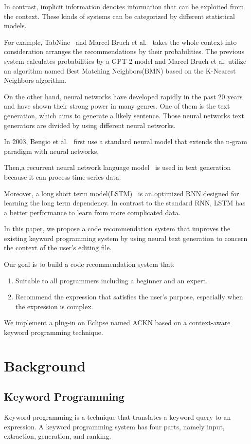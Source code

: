 \documentclass[PRO,english]{ipsj}
\begin{document}
In contrast, implicit information denotes information that can be exploited from the context. These kinds of systems can be categorized by different statistical models.

For example, TabNine~\cite{TabNine} and Marcel Bruch et al.~\cite{Marcel} takes the whole context into consideration arranges the recommendations by their probabilities. The previous system calculates probabilities by a GPT-2 model and Marcel Bruch et al. utilize an algorithm named Best Matching Neighbors(BMN) based on the K-Nearest Neighbors algorithm. 

On the other hand, neural networks have developed rapidly in the past 20 years and have shown their strong power in many genres. One of them is the text generation, which aims to generate a likely sentence. Those neural networks text generators are divided by using different neural networks.~\cite{NNTG}

In 2003, Bengio et al.~\cite{Bengio} first use a standard neural model that extends the n-gram paradigm with neural networks. 

Then,a recurrent neural network language model~\cite{RNN} is used in text generation because it can process time-series data.

Moreover, a long short term model(LSTM)~\cite{LSTM} is an optimized RNN designed for learning the long term dependency. In contrast to the standard RNN, LSTM has a better performance to learn from more complicated data.
		
In this paper, we propose a code recommendation system that improves the existing keyword programming system by using neural text generation to concern the context of the user’s editing file.

Our goal is to build a code recommendation system that:
\begin{enumerate}
\item Suitable to all programmers including a beginner and an expert.
\item Recommend the expression that satisfies the user’s purpose, especially when the expression is complex.
\end{enumerate}

We implement a plug-in on Eclipse named ACKN based on a context-aware keyword programming technique. 

\section{Background}
\subsection{Keyword Programming}
Keyword programming is a technique that translates a keyword query to an expression. A keyword programming system has four parts, namely input, extraction, generation, and ranking. 
\end{document}
